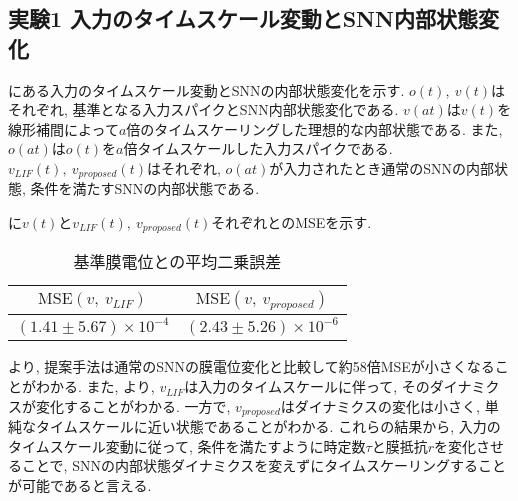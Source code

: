 \makeatletter %
\subsection{実験1 入力のタイムスケール変動とSNN内部状態変化}

にある入力のタイムスケール変動とSNNの内部状態変化を示す.
$o(t), ~ v(t)$はそれぞれ, 基準となる入力スパイクとSNN内部状態変化である.
$v(at)$は$v(t)$を線形補間によって$a$倍のタイムスケーリングした理想的な内部状態である.
また, $o(at)$は$o(t)$を$a$倍タイムスケールした入力スパイクである.
$v_{LIF}(t),~ v_{proposed}(t)$はそれぞれ, $o(at)$が入力されたとき通常のSNNの内部状態, 条件を満たすSNNの内部状態である.

に$v(t)$と$v_{LIF}(t),~ v_{proposed}(t)$それぞれとのMSEを示す.
\begin{table}[htb]
    \centering
    \caption{基準膜電位との平均二乗誤差}
    \label{sec4:tab:exp1}
    \begin{tabular}{cc}
        \hline
        $\mathbf{\mathrm{MSE}(\mathit{v,\ v_{LIF}})}$ & $\mathbf{\mathrm{MSE}(\mathit{v,\ v_{proposed}})}$\\
        \hline
        $(1.41 \pm 5.67) \times 10^{-4}$   & $(2.43\pm 5.26 )\times 10^{-6}$
    \end{tabular}
\end{table}

\textbf{}より, 提案手法は通常のSNNの膜電位変化と比較して約58倍MSEが小さくなることがわかる.
また, \textbf{}より, $v_{LIF}$は入力のタイムスケールに伴って, そのダイナミクスが変化することがわかる.
一方で, $v_{proposed}$はダイナミクスの変化は小さく, 単純なタイムスケールに近い状態であることがわかる.
これらの結果から, 入力のタイムスケール変動に従って, 条件を満たすように時定数$\tau$と膜抵抗$r$を変化させることで, SNNの内部状態ダイナミクスを変えずにタイムスケーリングすることが可能であると言える.